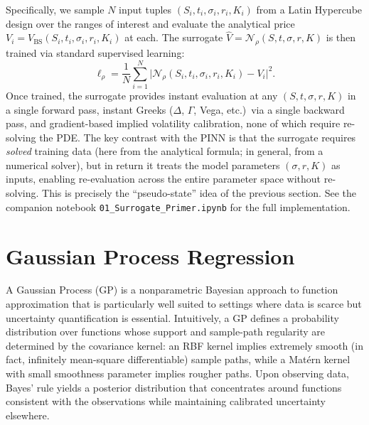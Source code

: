 \documentclass[11pt,a4paper]{report}
\begin{document}
Specifically, we sample $N$ input tuples $(S_i, t_i, \sigma_i, r_i, K_i)$ from a Latin Hypercube design over the ranges of interest and evaluate the analytical price $V_i = V_\mathrm{BS}(S_i, t_i, \sigma_i, r_i, K_i)$ at each.  The surrogate $\hat{V} = \mathcal{N}_\rho(S, t, \sigma, r, K)$ is then trained via standard supervised learning:
\begin{equation}
\ell_\rho = \frac{1}{N}\sum_{i=1}^N \bigl|\mathcal{N}_\rho(S_i, t_i, \sigma_i, r_i, K_i) - V_i\bigr|^2.
\end{equation}
Once trained, the surrogate provides instant evaluation at any $(S, t, \sigma, r, K)$ in a single forward pass, instant Greeks ($\Delta$, $\Gamma$, Vega, etc.)\ via a single backward pass, and gradient-based implied volatility calibration, none of which require re-solving the PDE.  The key contrast with the PINN is that the surrogate requires \emph{solved} training data (here from the analytical formula; in general, from a numerical solver), but in return it treats the model parameters $(\sigma, r, K)$ as inputs, enabling re-evaluation across the entire parameter space without re-solving.  This is precisely the ``pseudo-state'' idea of the previous section.  See the companion notebook \texttt{01\_Surrogate\_Primer.ipynb} for the full implementation.

\section{Gaussian Process Regression}

A Gaussian Process (GP) is a nonparametric Bayesian approach to function approximation \citep{Rasmussen:2005:GPM:1162254} that is particularly well suited to settings where data is scarce but uncertainty quantification is essential.  Intuitively, a GP defines a probability distribution over functions whose support and sample-path regularity are determined by the covariance kernel: an RBF kernel implies extremely smooth (in fact, infinitely mean-square differentiable) sample paths, while a Mat\'ern kernel with small smoothness parameter implies rougher paths.  Upon observing data, Bayes' rule yields a posterior distribution that concentrates around functions consistent with the observations while maintaining calibrated uncertainty elsewhere.
\end{document}
